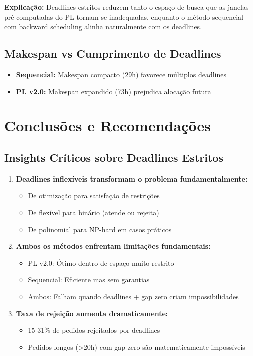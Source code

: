 \documentclass[11pt,a4paper]{article}
\begin{document}
\textbf{Explicação:} Deadlines estritos reduzem tanto o espaço de busca que as janelas pré-computadas do PL tornam-se inadequadas, enquanto o método sequencial com backward scheduling alinha naturalmente com os deadlines.

\subsection{Makespan vs Cumprimento de Deadlines}

\begin{itemize}
    \item \textbf{Sequencial:} Makespan compacto (29h) favorece múltiplos deadlines
    \item \textbf{PL v2.0:} Makespan expandido (73h) prejudica alocação futura
\end{itemize}

\section{Conclusões e Recomendações}

\subsection{Insights Críticos sobre Deadlines Estritos}

\begin{enumerate}
    \item \textbf{Deadlines inflexíveis transformam o problema fundamentalmente:}
    \begin{itemize}
        \item De otimização para satisfação de restrições
        \item De flexível para binário (atende ou rejeita)
        \item De polinomial para NP-hard em casos práticos
    \end{itemize}

    \item \textbf{Ambos os métodos enfrentam limitações fundamentais:}
    \begin{itemize}
        \item PL v2.0: Ótimo dentro de espaço muito restrito
        \item Sequencial: Eficiente mas sem garantias
        \item Ambos: Falham quando deadlines + gap zero criam impossibilidades
    \end{itemize}

    \item \textbf{Taxa de rejeição aumenta dramaticamente:}
    \begin{itemize}
        \item 15-31\% de pedidos rejeitados por deadlines
        \item Pedidos longos (>20h) com gap zero são matematicamente impossíveis
    \end{itemize}
\end{enumerate}
\end{document}
